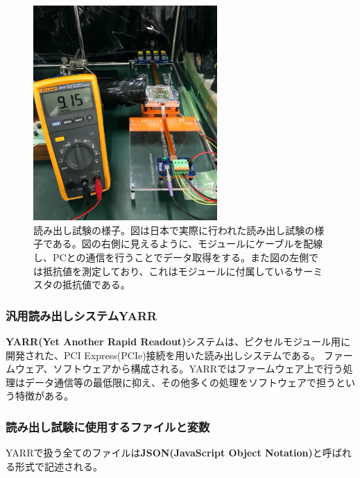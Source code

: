 \begin{figure}[bpt]\centering
\includegraphics[width=7cm]{readout_overview}
\caption[読み出し試験の様子]{読み出し試験の様子\cite{3-4}。図は日本で実際に行われた読み出し試験の様子である。図の右側に見えるように、モジュールにケーブルを配線し、PCとの通信を行うことでデータ取得をする。また図の左側では抵抗値を測定しており、これはモジュールに付属しているサーミスタの抵抗値である。}
\label{readout_overview}
\end{figure}

\subsubsection{汎用読み出しシステムYARR}
\textbf{YARR(Yet Another Rapid Readout)}システム\cite{3-3}は、ピクセルモジュール用に開発された、PCI Express(PCIe)接続を用いた読み出しシステムである。
ファームウェア、ソフトウェアから構成される。YARRではファームウェア上で行う処理はデータ通信等の最低限に抑え、その他多くの処理をソフトウェアで担うという特徴がある。

\subsubsection{読み出し試験に使用するファイルと変数}
YARRで扱う全てのファイルは\textbf{JSON(JavaScript Object Notation)}と呼ばれる形式で記述される。

